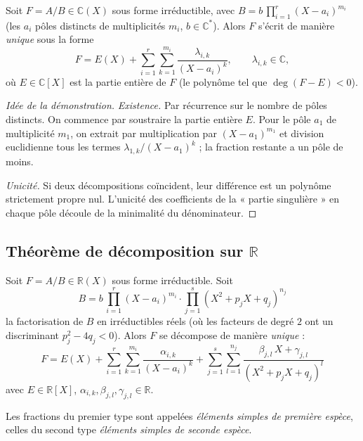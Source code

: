 \begin{theoreme}
Soit $F = A/B \in \mathbb{C}(X)$ sous forme irréductible, avec $B = b\, \prod_{i=1}^{r} (X - a_i)^{m_i}$ (les $a_i$ pôles distincts de multiplicités $m_i$, $b \in \mathbb{C}^*$). Alors $F$ s'écrit de manière \emph{unique} sous la forme
\[ F = E(X) + \sum_{i=1}^{r} \sum_{k=1}^{m_i} \frac{\lambda_{i, k}}{(X - a_i)^k}, \qquad \lambda_{i, k} \in \mathbb{C}, \]
où $E \in \mathbb{C}[X]$ est la partie entière de $F$ (le polynôme tel que $\deg(F - E) < 0$).
\end{theoreme}

\begin{proof}[Idée de la démonstration]
\emph{Existence.} Par récurrence sur le nombre de pôles distincts. On commence par soustraire la partie entière $E$. Pour le pôle $a_1$ de multiplicité $m_1$, on extrait par multiplication par $(X - a_1)^{m_1}$ et division euclidienne tous les termes $\lambda_{1, k}/(X - a_1)^k$ ; la fraction restante a un pôle de moins.

\emph{Unicité.} Si deux décompositions coïncident, leur différence est un polynôme strictement propre nul. L'unicité des coefficients de la « partie singulière » en chaque pôle découle de la minimalité du dénominateur.
\end{proof}

\subsection{Théorème de décomposition sur $\mathbb{R}$}

\begin{theoreme}
Soit $F = A/B \in \mathbb{R}(X)$ sous forme irréductible. Soit
\[ B = b\, \prod_{i=1}^{r} (X - a_i)^{m_i} \cdot \prod_{j=1}^{s} (X^2 + p_j X + q_j)^{n_j} \]
la factorisation de $B$ en irréductibles réels (où les facteurs de degré $2$ ont un discriminant $p_j^2 - 4 q_j < 0$). Alors $F$ se décompose de manière \emph{unique} :
\[ \boxed{\ F = E(X) + \sum_{i=1}^{r} \sum_{k=1}^{m_i} \frac{\alpha_{i, k}}{(X - a_i)^k} + \sum_{j=1}^{s} \sum_{l=1}^{n_j} \frac{\beta_{j, l}\, X + \gamma_{j, l}}{(X^2 + p_j X + q_j)^l}\ } \]
avec $E \in \mathbb{R}[X]$, $\alpha_{i, k}, \beta_{j, l}, \gamma_{j, l} \in \mathbb{R}$.

Les fractions du premier type sont appelées \emph{éléments simples de première espèce}, celles du second type \emph{éléments simples de seconde espèce}.
\end{theoreme}

